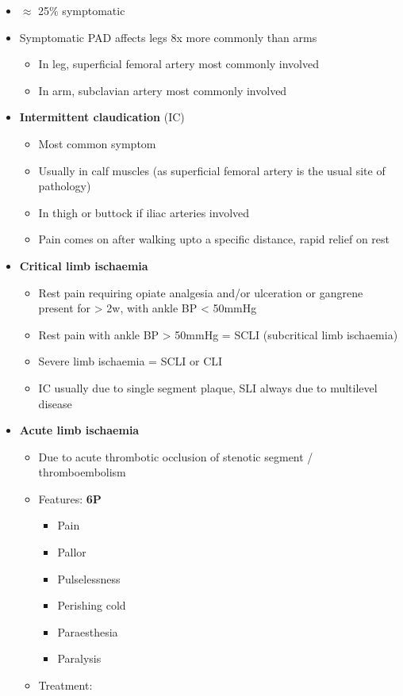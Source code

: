 \documentclass[
  12pt,
]{memoir}
\providecommand{\tightlist}{%
  \setlength{\itemsep}{0pt}\setlength{\parskip}{0pt}}
\begin{document}
\begin{itemize}
\tightlist
\item
  \(\approx\) 25\% symptomatic
\item
  Symptomatic PAD affects legs 8x more commonly than arms

  \begin{itemize}
  \tightlist
  \item
    In leg, superficial femoral artery most commonly involved
  \item
    In arm, subclavian artery most commonly involved
  \end{itemize}
\item
  \textbf{Intermittent claudication} (IC)

  \begin{itemize}
  \tightlist
  \item
    Most common symptom
  \item
    Usually in calf muscles (as superficial femoral artery is the usual
    site of pathology)
  \item
    In thigh or buttock if iliac arteries involved
  \item
    Pain comes on after walking upto a specific distance, rapid relief
    on rest
  \end{itemize}
\item
  \textbf{Critical limb ischaemia}

  \begin{itemize}
  \tightlist
  \item
    Rest pain requiring opiate analgesia and/or ulceration or gangrene
    present for \textgreater{} 2w, with ankle BP \textless{} 50mmHg
  \item
    Rest pain with ankle BP \textgreater{} 50mmHg = SCLI (subcritical
    limb ischaemia)
  \item
    Severe limb ischaemia = SCLI or CLI
  \item
    IC usually due to single segment plaque, SLI always due to
    multilevel disease
  \end{itemize}
\item
  \textbf{Acute limb ischaemia}

  \begin{itemize}
  \tightlist
  \item
    Due to acute thrombotic occlusion of stenotic segment /
    thromboembolism
  \item
    Features: \textbf{6P}

    \begin{itemize}
    \tightlist
    \item
      Pain
    \item
      Pallor
    \item
      Pulselessness
    \item
      Perishing cold
    \item
      Paraesthesia
    \item
      Paralysis
    \end{itemize}
  \item
    Treatment:


\end{itemize}
\end{itemize}
\end{document}

